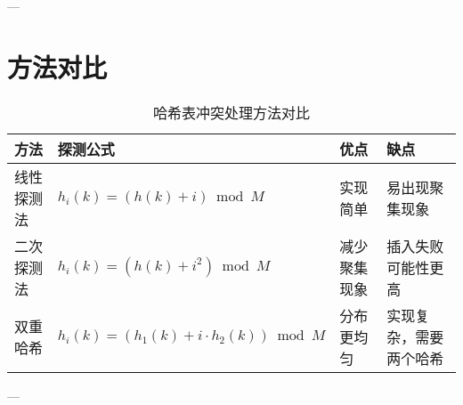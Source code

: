 \documentclass[a4paper,12pt]{article}
\begin{document}
---

\section{方法对比}
\begin{table}[h!]
\centering
\begin{tabular}{|l|l|l|l|}
\hline
\textbf{方法}      & \textbf{探测公式}                              & \textbf{优点}           & \textbf{缺点}           \\ \hline
线性探测法         & \( h_i(k) = (h(k) + i) \bmod M \)            & 实现简单               & 易出现聚集现象         \\ \hline
二次探测法         & \( h_i(k) = (h(k) + i^2) \bmod M \)          & 减少聚集现象           & 插入失败可能性更高     \\ \hline
双重哈希           & \( h_i(k) = (h_1(k) + i \cdot h_2(k)) \bmod M \) & 分布更均匀             & 实现复杂，需要两个哈希 \\ \hline
\end{tabular}
\caption{哈希表冲突处理方法对比}
\end{table}

---
\end{document}
